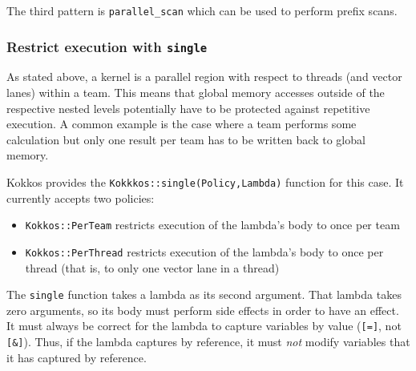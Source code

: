 The third pattern is \lstinline|parallel_scan| which can be used to perform prefix scans.

\subsubsection{Restrict execution with \lstinline|single|}

As stated above, a kernel is a parallel region with respect to threads (and vector lanes) within a team.
This means that global memory accesses outside of the respective nested levels potentially have to be protected against repetitive execution. 
A common example is the case where a team performs some calculation but only one result per team has to be written back to global memory. 

Kokkos provides the \lstinline|Kokkkos::single(Policy,Lambda)| function for this case.
It currently accepts two policies:
\begin{itemize}
\item \lstinline|Kokkos::PerTeam| restricts execution of the lambda's
  body to once per team
\item \lstinline|Kokkos::PerThread| restricts execution of the
  lambda's body to once per thread (that is, to only one vector lane
  in a thread)
\end{itemize}
The \lstinline!single! function takes a lambda as its second argument.
That lambda takes zero arguments, 
so its body must perform side effects in order to have an effect.
It must always be correct for the lambda to capture variables by value
(\lstinline![=]!, not \lstinline![&]!).
Thus, if the lambda captures by reference,
it must \emph{not} modify variables that it has captured by reference.

